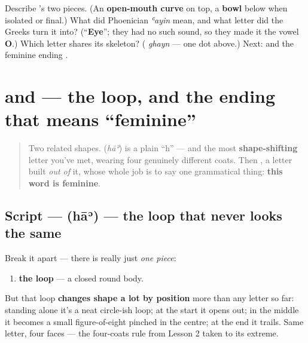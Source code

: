 \begin{tcolorbox}[breakable,colback=teal!4,colframe=teal!35!black,title={Before you move on}]
Describe \textbf{}'s two pieces. (An \textbf{open-mouth curve} on top, a \textbf{bowl} below when isolated or final.) What did Phoenician \emph{ʿayin} mean, and what letter did the Greeks turn it into? (\textquotedblleft{}\textbf{Eye}\textquotedblright{}; they had no such sound, so they made it the vowel \textbf{O}.) Which letter shares its skeleton? (\textbf{} \emph{ghayn} — one dot above.) Next: \textbf{} and the feminine ending \textbf{}.
\end{tcolorbox}
\section[\texorpdfstring{\ar{ه،} \ar{ة} (hāʾ, tāʾ marbūṭa)}{ه، ة (hāʾ, tāʾ marbūṭa)}]{ and  — the loop, and the ending that means \textquotedblleft{}feminine\textquotedblright{}}

\label{lesson:AR-W11-ha-and-ta-marbuta}



\begin{quote}
Two related shapes. \textbf{} (\emph{hāʾ}) is a plain \textquotedblleft{}h\textquotedblright{} — and the most \textbf{shape-shifting} letter you've met, wearing four genuinely different coats. Then \textbf{}, a letter built \emph{out of} it, whose whole job is to say one grammatical thing: \textbf{this word is feminine}.
\end{quote}

\subsection*{Script —  (hāʾ) — the loop that never looks the same}

Break it apart — there is really just \emph{one piece}:

\begin{enumerate}
\raggedright
  \item \textbf{the loop} — a closed round body.
\end{enumerate}

But that loop \textbf{changes shape a lot by position} more than any letter so far: standing alone it's a neat circle-ish loop; at the start it opens out; in the middle it becomes a small figure-of-eight pinched in the centre; at the end it trails. Same letter, four faces — the four-coats rule from Lesson 2 taken to its extreme.

